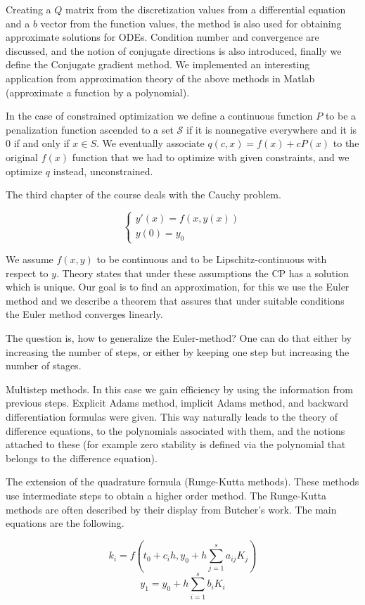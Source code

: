 \documentclass{article}
\begin{document}
Creating a $Q$ matrix from the discretization values from a differential equation and a $b$ vector from the function values, the method is also used for obtaining approximate solutions for ODEs. Condition number and convergence are discussed, and the notion of conjugate directions is also introduced, finally we define the Conjugate gradient method. We implemented an interesting application from approximation theory of the above methods in Matlab (approximate a function by a polynomial).

In the case of constrained optimization we define a continuous function $P$  to be a penalization function ascended to a set $\mathcal{S}$ if it is nonnegative everywhere and it is $0$ if and only if $x \in {S}$. We eventually associate $q(c,x) = f(x) + cP(x)$ to the original $f(x)$ function that we had to optimize with given constraints, and we optimize $q$ instead, unconstrained.

The third chapter of the course deals with the Cauchy problem.

\begin{equation}
   \begin{cases}
               y'(x) = f(x, y(x)) \\
               y(0) = y_0
   \end{cases}
\end{equation}

We assume $f(x,y)$ to be continuous and to be Lipschitz-continuous with respect to $y$. Theory states that under these assumptions the CP has a solution which is unique. Our goal is to find an approximation, for this we use the Euler method and we describe a theorem that assures that under suitable conditions the Euler method converges linearly.

The question is, how to generalize the Euler-method? One can do that either by increasing the number of steps, or either by keeping one step but increasing the number of stages.

\begin{outline}[enumerate]

\1 Multistep methods. In this case we gain efficiency by using the information from previous steps. Explicit Adams method, implicit Adams method, and backward differentiation formulas were given. This way naturally leads to the theory of difference equations, to the polynomials associated with them, and the notions attached to these (for example zero stability is defined via the polynomial that belongs to the difference equation).

\1 The extension of the quadrature formula (Runge-Kutta methods). These methods use intermediate steps to obtain a higher order method. The Runge-Kutta methods are often described by their display from Butcher's work. The main equations are the following.

\[ k_i = f(t_0 + c_i h, y_0 + h \sum_{j=1}^s a_{ij}K_j) \]
\[ y_1 = y_0 + h \sum_{i=1}^s b_i K_i \]

\end{outline}
\end{document}
